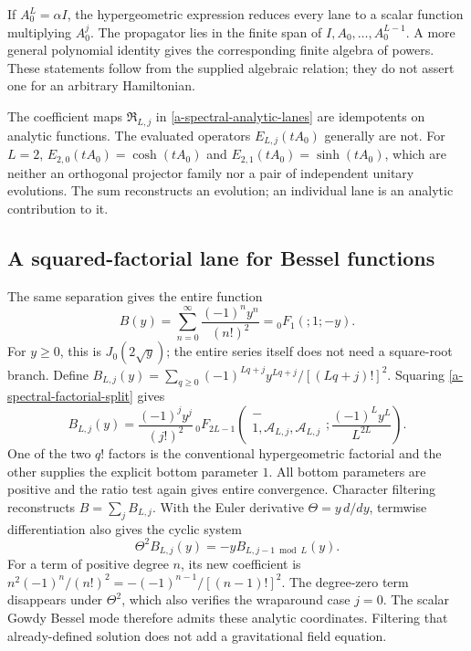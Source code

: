 If $A_0^L=\alpha I$, the hypergeometric expression reduces every
lane to a scalar function multiplying $A_0^j$. The propagator lies
in the finite span of $I,A_0,\ldots,A_0^{L-1}$. A more general
polynomial identity gives the corresponding finite algebra of powers.
These statements follow from the supplied algebraic relation; they
do not assert one for an arbitrary Hamiltonian.

The coefficient maps $\mathfrak R_{L,j}$ in
\eqref{a-spectral-analytic-lanes} are idempotents on analytic functions.
The evaluated operators $E_{L,j}(tA_0)$ generally are not.
For $L=2$, $E_{2,0}(tA_0)=\cosh(tA_0)$ and
$E_{2,1}(tA_0)=\sinh(tA_0)$, which are neither an orthogonal
projector family nor a pair of independent unitary evolutions.
The sum reconstructs an evolution; an individual lane is an analytic
contribution to it.

\subsection{A squared-factorial lane for Bessel functions}

The same separation gives the entire function
\[
 B(y)=\sum_{n=0}^\infty\frac{(-1)^ny^n}{(n!)^2}
     ={}_0F_1(;1;-y).
\]
For $y\geq0$, this is $J_0(2\sqrt y)$; the entire series itself
does not need a square-root branch. Define
$B_{L,j}(y)=\sum_{q\geq0}(-1)^{Lq+j}y^{Lq+j}/[(Lq+j)!]^2$.
Squaring \eqref{a-spectral-factorial-split} gives
\begin{equation}
 B_{L,j}(y)
 =\frac{(-1)^jy^j}{(j!)^2}\,
 {}_0F_{2L-1}\!\left(
 \begin{matrix}-\\1,\mathcal A_{L,j},\mathcal A_{L,j}\end{matrix};
 \frac{(-1)^Ly^L}{L^{2L}}\right).
 \label{a-spectral-bessel-lane}
\end{equation}
One of the two $q!$ factors is the conventional hypergeometric
factorial and the other supplies the explicit bottom parameter $1$.
All bottom parameters are positive and the ratio test again gives
entire convergence. Character filtering reconstructs $B=\sum_jB_{L,j}$.
With the Euler derivative $\Theta=y\,d/dy$, termwise differentiation
also gives the cyclic system
\begin{equation}
 \Theta^2B_{L,j}(y)=-yB_{L,j-1\bmod L}(y).
 \label{a-spectral-bessel-euler}
\end{equation}
For a term of positive degree $n$, its new coefficient is
$n^2(-1)^n/(n!)^2=-(-1)^{n-1}/[(n-1)!]^2$.
The degree-zero term disappears under $\Theta^2$, which also verifies
the wraparound case $j=0$. The scalar Gowdy Bessel mode therefore
admits these analytic coordinates. Filtering that already-defined
solution does not add a gravitational field equation.




